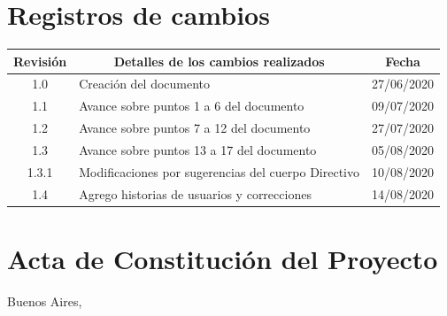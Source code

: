 \documentclass[11pt]{charter}
\begin{document}
\maketitle
\thispagestyle{empty}
\pagebreak


\thispagestyle{empty}
{\setlength{\parskip}{0pt}
\tableofcontents{}
}
\pagebreak


\section{Registros de cambios}
\label{sec:registro}


\begin{table}[ht]
\label{tab:registro}
\centering
\begin{tabularx}{\linewidth}{@{}|c|X|c|@{}}
\hline
\rowcolor[HTML]{C0C0C0} 
Revisión & \multicolumn{1}{c|}{\cellcolor[HTML]{C0C0C0}Detalles de los cambios realizados} & Fecha      \\ \hline
1.0      & Creación del documento                                          & 27/06/2020 \\ \hline
1.1      & Avance sobre puntos 1 a 6 del documento                                                               & 09/07/2020 \\ \hline
1.2      & Avance sobre puntos 7 a 12 del documento                                                               & 27/07/2020 \\ \hline
1.3      & Avance sobre puntos 13 a 17 del documento                                                               & 05/08/2020 \\ \hline
1.3.1    & Modificaciones por sugerencias del cuerpo Directivo                                                               & 10/08/2020 \\ \hline
1.4      & Agrego historias de usuarios y correcciones                                                               & 14/08/2020 \\ \hline
\end{tabularx}
\end{table}

\pagebreak



\section{Acta de Constitución del Proyecto}
\label{sec:acta}

\begin{flushright}
Buenos Aires, \fechaInicioName
\end{flushright}
\end{document}
